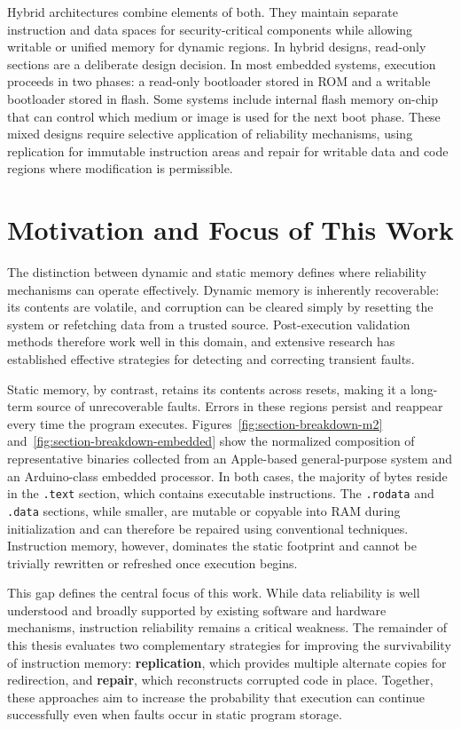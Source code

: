Hybrid architectures combine elements of both. They maintain separate instruction and data spaces for security-critical components while allowing writable or unified memory for dynamic regions. In hybrid designs, read-only sections are a deliberate design decision. In most embedded systems, execution proceeds in two phases: a read-only bootloader stored in ROM and a writable bootloader stored in flash. Some systems include internal flash memory on-chip that can control which medium or image is used for the next boot phase. These mixed designs require selective application of reliability mechanisms, using replication for immutable instruction areas and repair for writable data and code regions where modification is permissible.


\section{Motivation and Focus of This Work}
\label{sec:motivation}

The distinction between dynamic and static memory defines where reliability mechanisms can operate effectively. Dynamic memory is inherently recoverable: its contents are volatile, and corruption can be cleared simply by resetting the system or refetching data from a trusted source. Post-execution validation methods therefore work well in this domain, and extensive research has established effective strategies for detecting and correcting transient faults.

Static memory, by contrast, retains its contents across resets, making it a long-term source of unrecoverable faults. Errors in these regions persist and reappear every time the program executes. Figures~\ref{fig:section-breakdown-m2} and~\ref{fig:section-breakdown-embedded} show the normalized composition of representative binaries collected from an Apple-based general-purpose system and an Arduino-class embedded processor. In both cases, the majority of bytes reside in the \texttt{.text} section, which contains executable instructions. The \texttt{.rodata} and \texttt{.data} sections, while smaller, are mutable or copyable into RAM during initialization and can therefore be repaired using conventional techniques. Instruction memory, however, dominates the static footprint and cannot be trivially rewritten or refreshed once execution begins.

This gap defines the central focus of this work. While data reliability is well understood and broadly supported by existing software and hardware mechanisms, instruction reliability remains a critical weakness. The remainder of this thesis evaluates two complementary strategies for improving the survivability of instruction memory: \textbf{replication}, which provides multiple alternate copies for redirection, and \textbf{repair}, which reconstructs corrupted code in place. Together, these approaches aim to increase the probability that execution can continue successfully even when faults occur in static program storage.

